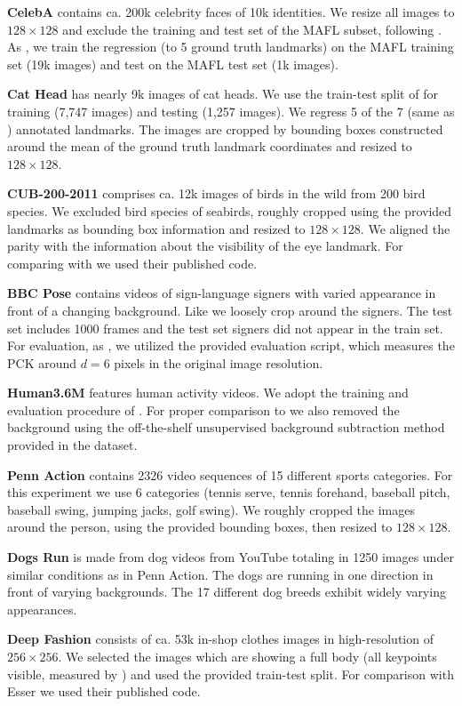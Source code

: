 \textbf{CelebA} \cite{Liu:2015vj} contains ca. 200k celebrity faces of 10k identities.
We resize all images to $128\times 128$ and exclude the training and test set of the MAFL subset, following \cite{Thewlis:2017wi}.
As  \cite{Thewlis:2017wi, Zhang:2018vz}, we train the regression (to 5 ground truth landmarks) on the MAFL training set (19k images) and test on the MAFL test set (1k images).

\textbf{Cat Head} \cite{Zhang:2008uj}  has nearly 9k images of cat heads.
We use the train-test split of \cite{Zhang:2018vz} for training (7,747 images) and testing (1,257 images).
We regress 5 of the 7 (same as \cite{Zhang:2018vz}) annotated landmarks.
The images are cropped by bounding boxes constructed around the mean of the ground truth landmark coordinates and resized to $128\times128$.


\textbf{CUB-200-2011} \cite{Wah:2011vq} comprises ca. 12k images of birds in the wild from 200 bird species.
We excluded bird species of seabirds, roughly cropped using the provided landmarks as bounding box information and resized to $128\times128$.
We aligned the parity with the information about the visibility of the eye landmark.
For comparing with \cite{Zhang:2018vz} we used their published code.


\textbf{BBC Pose} \cite{Charles:2013tb} contains videos of sign-language signers with varied appearance in front of a changing background. Like \cite{Jakab:2018wc} we loosely crop around the signers.
The test set includes 1000 frames and the test set signers did not appear in the train set.
For evaluation, as \cite{Jakab:2018wc}, we utilized the provided evaluation script, which measures the PCK around $d=6$ pixels in the original image resolution.


\textbf{Human3.6M} \cite{Ionescu:2014ua} features human activity videos.
We adopt the training and evaluation procedure of \cite{Zhang:2018vz}.
For proper comparison to \cite{Zhang:2018vz} we also removed the background using the off-the-shelf unsupervised background subtraction method provided in the dataset.


\textbf{Penn Action} \cite{Zhang:2013tr} contains 2326 video sequences of 15 different sports categories.
For this experiment we use 6 categories (tennis serve, tennis forehand, baseball pitch, baseball swing, jumping jacks, golf swing).
We roughly cropped the images around the person, using the provided bounding boxes, then resized to $128\times128$.


\textbf{Dogs Run} is made from dog videos from YouTube totaling in 1250 images under similar conditions as in Penn Action. The dogs are running in one direction in front of varying backgrounds. The 17 different dog breeds exhibit widely varying appearances.


\textbf{Deep Fashion} \cite{Liu:2016vv} consists of ca. 53k in-shop clothes images in high-resolution of $256 \times 256$. We selected the images which are showing a full body (all keypoints visible, measured by \cite{Cao:2017vv}) and used the provided train-test split.
For comparison with Esser \etal \cite{Esser:2018ue} we used their published code.


